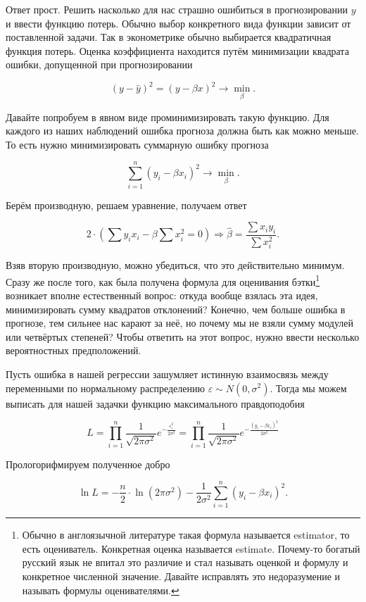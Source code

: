 \documentclass[12pt, a4paper, oneside]{extreport}
\def \hb{\hat{\beta}}
\def \b{\beta}
\def \e{\varepsilon}
\theoremstyle{plain}              %
\theoremstyle{definition}         %
\begin{document}
Ответ прост. Решить насколько для нас страшно ошибиться в прогнозировании $y$ и ввести функцию потерь. Обычно выбор конкретного вида функции зависит от поставленной задачи.  Так в эконометрике обычно выбирается квадратичная функция потерь. Оценка коэффициента находится путём минимизации квадрата ошибки, допущенной при прогнозировании

\[ (y - \hat y)^2 = (y - \b x)^2 \to \min_{\b}. \]

Давайте попробуем в явном виде проминимизировать такую функцию. Для каждого из наших наблюдений ошибка прогноза должна быть как можно меньше. То есть нужно минимизировать суммарную ошибку прогноза 

\[  \sum_{i=1}^n(y_i - \b x_i)^2  \to \min_{\b}.  \]

Берём производную, решаем уравнение, получаем ответ

\begin{equation*}
2 \cdot \left(\sum y_i x_i - \b \sum x_i^2  = 0 \right) \Rightarrow \hb = \frac{\sum x_i y_i}{\sum x_i^2}.
\end{equation*}

Взяв вторую производную, можно убедиться, что это действительно минимум.  Сразу же после того, как была получена формула для оценивания бэтки\footnote{Обычно в англоязычной литературе такая формула называется estimator, то есть оцениватель. Конкретная оценка называется estimate. Почему-то богатый русский язык не впитал это различие и стал называть оценкой и формулу и конкретное численной значение. Давайте исправлять это недоразумение и называть формулы оценивателями.} возникает вполне естественный вопрос: откуда вообще взялась эта идея, минимизировать сумму квадратов отклонений?  Конечно, чем больше ошибка в прогнозе, тем сильнее нас карают за неё, но почему мы не взяли сумму модулей или четвёртых степеней?  Чтобы ответить на этот вопрос, нужно ввести несколько вероятностных предположений. 

Пусть ошибка в нашей регрессии  зашумляет истинную взаимосвязь между переменными по нормальному распределению $\e \sim N(0, \sigma^2)$. Тогда мы можем выписать для нашей задачки функцию максимального правдоподобия

\[ L =  \prod_{i=1}^{n} \frac{1}{\sqrt{2\pi \sigma^2}} e^{- \frac{\e_i^2}{2 \sigma^2}   } =  \prod_{i=1}^{n} \frac{1}{\sqrt{2\pi \sigma^2}} e^{- \frac{(y_i - \b x_i)^2}{2 \sigma^2}   } \]

Прологорифмируем полученное добро

\[ \ln L = -\frac{n}{2} \cdot \ln(2 \pi \sigma^2) - \frac{1}{2\sigma^2} \sum_{i=1}^n (y_i - \b x_i)^2. \]
\end{document}
